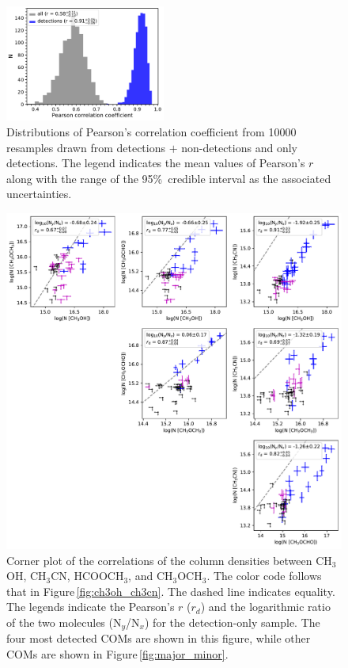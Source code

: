 \documentclass[twocolumn]{aastex62}
\newcommand{\methylformate}{\mbox{HCOOCH$_{3}$}}
\newcommand{\methanol}{\mbox{CH$_{3}$OH}}
\newcommand{\dimethylether}{\mbox{CH$_{3}$OCH$_{3}$}}
\newcommand{\methylcyanide}{\mbox{CH$_{3}$CN}}
\begin{document}
\begin{figure}[htbp!]
  \centering
  \includegraphics[width=0.47\textwidth]{pearson_r_ch3oh_ch3cn.pdf}
  \caption{Distributions of Pearson's correlation coefficient from 10000 resamples drawn from detections $+$ non-detections and only detections.  The legend indicates the mean values of Pearson's $r$ along with the range of the 95\%\ credible interval as the associated uncertainties.}
  \label{fig:pearson_distribution}
\end{figure}

\begin{figure}[htbp!]
  \centering
  \includegraphics[width=\textwidth]{corner_Ncol_correlations.pdf}
  \caption{Corner plot of the correlations of the column densities between \methanol, \methylcyanide, \methylformate, and \dimethylether.  The color code follows that in Figure\,\ref{fig:ch3oh_ch3cn}.  The dashed line indicates equality.  The legends indicate the Pearson's $r$ ($r_{d}$) and the logarithmic ratio of the two molecules (N$_{y}$/N$_{x}$) for the detection-only sample.  The four most detected COMs are shown in this figure, while other COMs are shown in Figure\,\ref{fig:major_minor}.}
  \label{fig:corner}
\end{figure}
\end{document}

